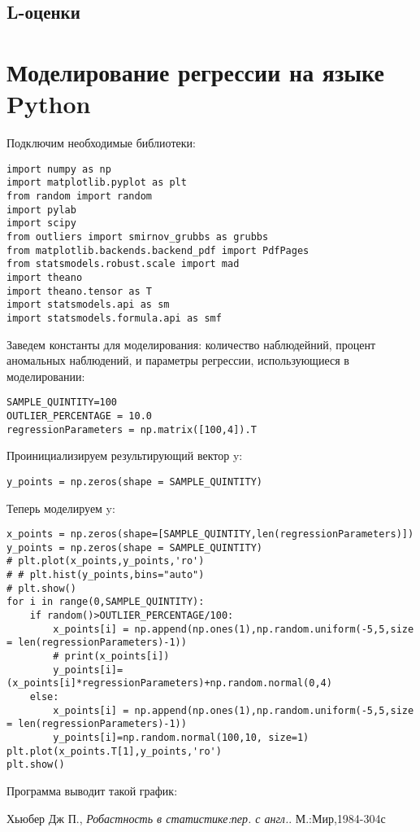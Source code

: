 \documentclass[12pt]{article}
\begin{document}
\subsection{L-оценки}


\section{Моделирование регрессии на языке Python}
Подключим необходимые библиотеки:\hfill\break
\begin{verbatim}
import numpy as np
import matplotlib.pyplot as plt
from random import random
import pylab
import scipy
from outliers import smirnov_grubbs as grubbs
from matplotlib.backends.backend_pdf import PdfPages
from statsmodels.robust.scale import mad
import theano
import theano.tensor as T
import statsmodels.api as sm
import statsmodels.formula.api as smf
\end{verbatim}
Заведем константы для моделирования: количество наблюдейний, процент аномальных наблюдений, и параметры регрессии, использующиеся в моделировании:
\begin{verbatim}
SAMPLE_QUINTITY=100
OUTLIER_PERCENTAGE = 10.0
regressionParameters = np.matrix([100,4]).T
\end{verbatim}
Проинициализируем результирующий вектор y:
\begin{verbatim}
y_points = np.zeros(shape = SAMPLE_QUINTITY)
\end{verbatim}
Теперь моделируем y:
\begin{verbatim}
x_points = np.zeros(shape=[SAMPLE_QUINTITY,len(regressionParameters)])
y_points = np.zeros(shape = SAMPLE_QUINTITY)
# plt.plot(x_points,y_points,'ro')
# # plt.hist(y_points,bins="auto")
# plt.show()
for i in range(0,SAMPLE_QUINTITY):
    if random()>OUTLIER_PERCENTAGE/100:
        x_points[i] = np.append(np.ones(1),np.random.uniform(-5,5,size = len(regressionParameters)-1))
        # print(x_points[i])
        y_points[i]=(x_points[i]*regressionParameters)+np.random.normal(0,4)
    else:
        x_points[i] = np.append(np.ones(1),np.random.uniform(-5,5,size = len(regressionParameters)-1))
        y_points[i]=np.random.normal(100,10, size=1)
plt.plot(x_points.T[1],y_points,'ro')
plt.show()
\end{verbatim}
Программа выводит такой график:
\newpage
\begin{thebibliography}{9}
    Хьюбер Дж П.,
    \textit{Робастность в статистике:пер. с англ.}.
    М.:Мир,1984-304с


\end{thebibliography}
\end{document}
